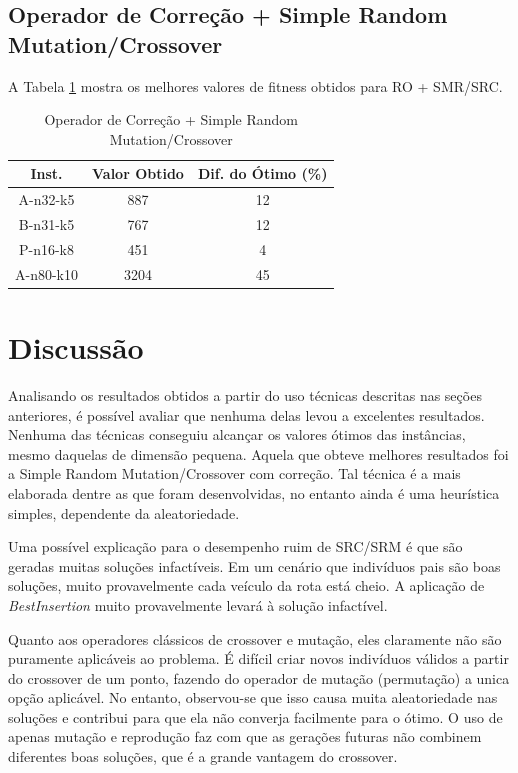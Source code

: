 \documentclass[conference]{IEEEtran}
\begin{document}
\newpage

\subsection{Operador de Correção + Simple Random Mutation/Crossover}

A Tabela \ref{table_correction} mostra os melhores valores de fitness obtidos para RO + SMR/SRC.

\begin{table}[!t]
\renewcommand{\arraystretch}{1.3}
\centering
\caption{Operador de Correção + Simple Random Mutation/Crossover}
\label{table_correction}
\begin{tabular}{|c||c||c|}
\hline
Inst. & Valor Obtido & Dif. do Ótimo (\%)\\
\hline
A-n32-k5 & 887 & 12\\
B-n31-k5 & 767 & 12\\
P-n16-k8 & 451 & 4\\
A-n80-k10 & 3204 & 45\\
\hline
\end{tabular}
\end{table}

\section{Discussão}
Analisando os resultados obtidos a partir do uso técnicas descritas nas seções anteriores, é possível avaliar que nenhuma delas levou a excelentes resultados. Nenhuma das técnicas conseguiu alcançar os valores ótimos das instâncias, mesmo daquelas de dimensão pequena.
Aquela que obteve melhores resultados foi a Simple Random Mutation/Crossover com correção. Tal técnica é a mais elaborada dentre as que foram desenvolvidas, no entanto ainda é uma heurística simples, dependente da aleatoriedade. 

Uma possível explicação para o desempenho ruim de SRC/SRM é que são geradas muitas soluções infactíveis. Em um cenário que indivíduos pais são boas soluções, muito provavelmente cada veículo da rota está cheio. A aplicação de \textit{BestInsertion} muito provavelmente levará à solução infactível. 

Quanto aos operadores clássicos de crossover e mutação, eles claramente não são puramente aplicáveis ao problema. É difícil criar novos indivíduos válidos a partir do crossover de um ponto, fazendo do operador de mutação (permutação) a unica opção aplicável. No entanto, observou-se que isso causa muita aleatoriedade nas soluções e contribui para que ela não converja facilmente para o ótimo. O uso de apenas mutação e reprodução faz com que as gerações futuras não combinem diferentes boas soluções, que é a grande vantagem do crossover.
\end{document}
